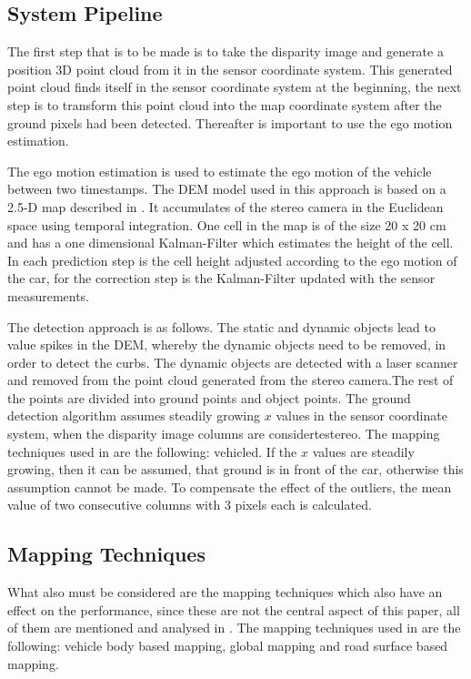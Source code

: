 \subsection{System Pipeline}

The first step that is to be made is to take the disparity image and generate a position 3D point cloud from it in the sensor coordinate system. This generated point cloud finds itself in the sensor coordinate system at the beginning, the next step is to transform this point cloud into the map coordinate system after the ground pixels had been detected. Thereafter is important to use the ego motion estimation. 

The ego motion estimation is used to estimate the ego motion of the vehicle between two timestamps. The DEM model used in this approach is based on a 2.5-D map described in \cite{bewegung}. It accumulates of the stereo camera in the Euclidean space using temporal integration. One cell in the map is of the size 20 x 20 cm and has a one dimensional Kalman-Filter which estimates the height of the cell. In each prediction step is the cell height adjusted according to the ego motion of the car, for the correction step is the Kalman-Filter updated with the sensor measurements. 

The detection approach is as follows. The static and dynamic objects lead to value spikes in the DEM, whereby the dynamic objects need to be removed, in order to detect the curbs. The dynamic objects are detected with a laser scanner and removed from the point cloud generated from the stereo camera.The rest of the points are divided into ground points and object points. The ground detection algorithm assumes steadily growing $x$ values in the sensor coordinate system, when the disparity image columns are considerte{stereo}. The mapping techniques used in \cite{stereo} are the following: vehicled. If the $x$ values are steadily growing, then it can be assumed, that ground is in front of the car, otherwise this assumption cannot be made. To compensate the effect of the outliers, the mean value of two consecutive columns with 3 pixels each is calculated.

\subsection{Mapping Techniques}

What also must be considered are the mapping techniques which also have an effect on the performance, since these are not the central aspect of this paper, all of them are mentioned and analysed in \cite{stereo}. The mapping techniques used in \cite{stereo} are the following: vehicle body based mapping, global mapping and road surface based mapping. 


